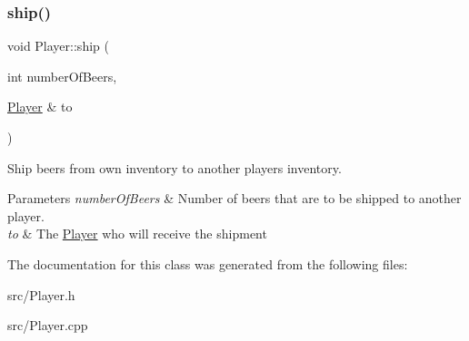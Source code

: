 \subsubsection{\texorpdfstring{ship()}{ship()}}
{\footnotesize\ttfamily void Player\+::ship (\begin{DoxyParamCaption}\item[{int}]{number\+Of\+Beers,  }\item[{\hyperlink{classPlayer}{Player} \&}]{to }\end{DoxyParamCaption})}

Ship beers from own inventory to another player\textquotesingle{}s inventory. 
\begin{DoxyParams}{Parameters}
{\em number\+Of\+Beers} & Number of beers that are to be shipped to another player. \\
\hline
{\em to} & The \hyperlink{classPlayer}{Player} who will receive the shipment \\
\hline
\end{DoxyParams}


The documentation for this class was generated from the following files\+:\begin{DoxyCompactItemize}
\item 
src/Player.\+h\item 
src/Player.\+cpp\end{DoxyCompactItemize}
